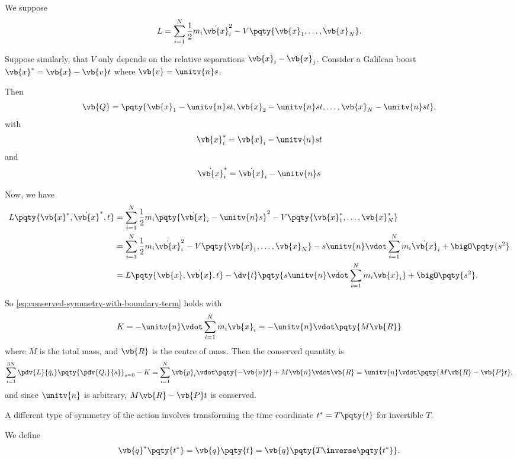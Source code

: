\begin{example}
    We suppose
    \[
        L = \sum_{i = 1}^{N} \frac{1}{2} m_i \dot{\vb{x}}_i^2 - V\pqty{\vb{x}_1, \ldots, \vb{x}_N}.
    \]

    Suppose similarly, that \(V\) only depends on the relative separations \(\vb{x}_i - \vb{x}_j\). Consider a Galilean boost \(\vb{x}^{\ast} = \vb{x} - \vb{v} t\) where \(\vb{v} = \unitv{n} s\).

    Then
    \[
        \vb{Q} = \pqty{\vb{x}_1 - \unitv{n}st, \vb{x}_2 - \unitv{n}st, \ldots, \vb{x}_N - \unitv{n}st},
    \]
    with
    \[
        \vb{x}_i^{\ast} = \vb{x}_i - \unitv{n}st
    \]
    and
    \[
        \dot{\vb{x}}_i^{\ast} = \dot{\vb{x}}_i - \unitv{n}s
    \]

    Now, we have
    \begin{align*}
        L \pqty{\vb{x}^{\ast}, \dot{\vb{x}}^{\ast}, t} &= \sum_{i = 1}^{N} \frac{1}{2} m_i \pqty{\dot{\vb{x}}_i - \unitv{n}s}^2 - V \pqty{\vb{x}_1^{\ast}, \ldots, \vb{x}_N^{\ast}} \\
        &= \sum_{i = 1}^{N} \frac{1}{2} m_i \dot{\vb{x}}_i^2 - V\pqty{\vb{x}_1, \ldots, \vb{x}_N} - s \unitv{n} \vdot \sum_{i = 1}^{N} m_i \dot{\vb{x}}_i + \bigO \pqty{s^2} \\
        &= L\pqty{\vb{x}, \dot{\vb{x}}, t} - \dv{t} \pqty{s \unitv{n} \vdot \sum_{i = 1}^{N} m_i \vb{x}_i} + \bigO \pqty{s^2}.
    \end{align*}

    So \eqref{eq:conserved-symmetry-with-boundary-term} holds with
    \[
        K = - \unitv{n} \vdot \sum_{i = 1}^{N} m_i \vb{x}_i = - \unitv{n} \vdot \pqty{M \vb{R}}
    \]
    where \(M\) is the total mass, and \(\vb{R}\) is the centre of mass. Then the conserved quantity is
    \[
        \sum_{i = 1}^{3N} \pdv{L}{\dot{q}_i} \pqty{\pdv{Q_i}{s}}_{s = 0} - K = \sum_{i = 1}^{N} \vb{p}_i \vdot \pqty{- \vb{n} t} + M \vb{n} \vdot \vb{R} = \unitv{n} \vdot \pqty{M \vb{R} - \vb{P} t},
    \]
    and since \(\unitv{n}\) is arbitrary, \(M \vb{R} - \vb{P} t\) is conserved.
\end{example}

A different type of symmetry of the action involves transforming the time coordinate \(t^{\ast} = T \pqty{t}\) for invertible \(T\).

\begin{definition}
    We define
    \[
        \vb{q}^{\ast} \pqty{t^{\ast}} = \vb{q} \pqty{t} = \vb{q} \pqty{T \inverse \pqty{t^{\ast}}}.
    \]
\end{definition}

